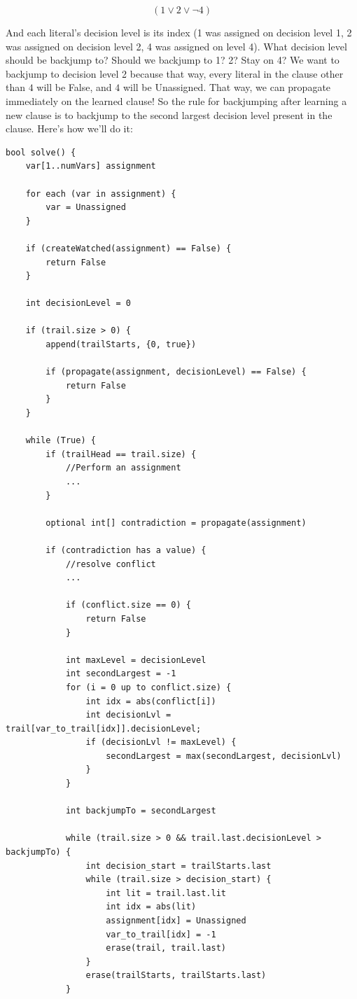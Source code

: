 \documentclass[oneside]{book}
\begin{document}
$$ (1 \vee 2 \vee \neg 4) $$

And each literal's decision level is its index (1 was assigned on decision level 1, 
2 was assigned on decision level 2, 4 was assigned on level 4). What decision level 
should be backjump to? Should we backjump to 1? 2? Stay on 4? We want to backjump to 
decision level 2 because that way, every literal in the clause other than $4$ will 
be False, and $4$ will be Unassigned. That way, we can propagate immediately on the 
learned clause! So the rule for backjumping after learning a new clause is to backjump 
to the second largest decision level present in the clause. Here's how we'll do it:

\begin{lstlisting}
bool solve() {
    var[1..numVars] assignment

    for each (var in assignment) {
        var = Unassigned
    }

    if (createWatched(assignment) == False) {
        return False
    }

    int decisionLevel = 0

    if (trail.size > 0) {
        append(trailStarts, {0, true})

        if (propagate(assignment, decisionLevel) == False) {
            return False
        }
    }

    while (True) {
        if (trailHead == trail.size) {
            //Perform an assignment
            ...
        }

        optional int[] contradiction = propagate(assignment)

        if (contradiction has a value) {
            //resolve conflict
            ...

            if (conflict.size == 0) {
                return False
            }

            int maxLevel = decisionLevel
            int secondLargest = -1
            for (i = 0 up to conflict.size) {
                int idx = abs(conflict[i])
                int decisionLvl = trail[var_to_trail[idx]].decisionLevel;
                if (decisionLvl != maxLevel) {
                    secondLargest = max(secondLargest, decisionLvl)
                }
            }

            int backjumpTo = secondLargest

            while (trail.size > 0 && trail.last.decisionLevel > backjumpTo) {
                int decision_start = trailStarts.last
                while (trail.size > decision_start) {
                    int lit = trail.last.lit
                    int idx = abs(lit)
                    assignment[idx] = Unassigned
                    var_to_trail[idx] = -1
                    erase(trail, trail.last)
                }
                erase(trailStarts, trailStarts.last)
            }


\end{lstlisting}
\end{document}
